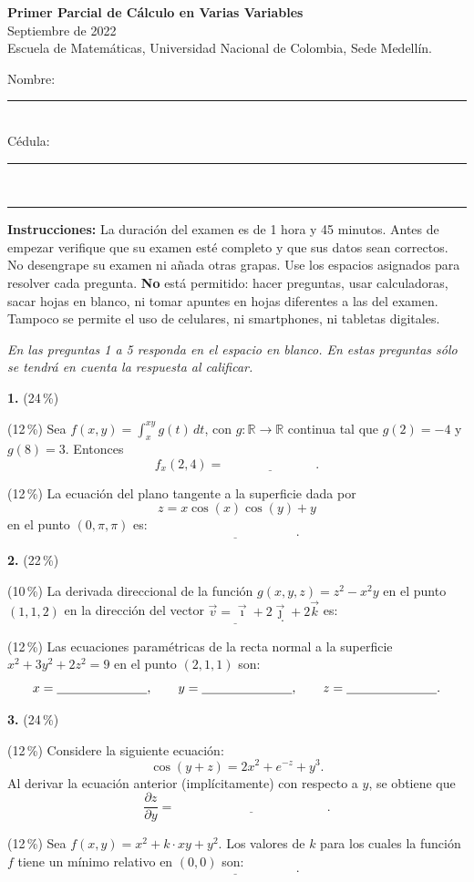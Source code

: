\documentclass[11pt]{article}
\newcommand{\examheader}{%
  \noindent
  \begin{minipage}[t]{0.62\linewidth}
    {\bfseries\large Primer Parcial de C\'alculo en Varias Variables}\\
    {\small Septiembre de 2022}\\
    {\small Escuela de Matem\'aticas, Universidad Nacional de Colombia, Sede Medell\'in.}
  \end{minipage}%
  \hfill
  \begin{minipage}[t]{0.33\linewidth}
    \raggedleft\small
    Nombre: \rule{2.8cm}{0.4pt}\\[4pt]
    C\'edula: \rule{2.8cm}{0.4pt}
  \end{minipage}\\[4pt]
  \rule{\linewidth}{0.6pt}
}
\begin{document}
\examheader

\textbf{Instrucciones:} La duraci\'on del examen es de 1 hora y 45 minutos. Antes de empezar verifique que su examen est\'e completo y que sus datos sean correctos. No desengrape su examen ni a\~nada otras grapas. Use los espacios asignados para resolver cada pregunta. \textbf{No} est\'a permitido: hacer preguntas, usar calculadoras, sacar hojas en blanco, ni tomar apuntes en hojas diferentes a las del examen. Tampoco se permite el uso de celulares, ni smartphones, ni tabletas digitales.

\bigskip

\textit{En las preguntas 1 a 5 responda en el espacio en blanco. En estas preguntas s\'olo se tendr\'a en cuenta la respuesta al calificar.}

\bigskip
\noindent\textbf{1.} (24\,\%)

\begin{opciones}
  \item[(a)] (12\,\%) Sea $\displaystyle f(x,y) = \int_x^{xy} g(t)\,dt$, con $g:\mathbb{R}\to\mathbb{R}$ continua tal que $g(2)=-4$ y $g(8)=3$. Entonces
  $$f_x(2,4) = \underline{\hspace{3cm}}.$$
  \item[(b)] (12\,\%) La ecuaci\'on del plano tangente a la superficie dada por
  $$z = x\cos(x)\cos(y) + y$$
  en el punto $(0,\pi,\pi)$ es:
  $$\underline{\hspace{4cm}}.$$
\end{opciones}

\bigskip
\noindent\textbf{2.} (22\,\%)

\begin{opciones}
  \item[(a)] (10\,\%) La derivada direccional de la funci\'on $g(x,y,z)=z^2-x^2y$ en el punto $(1,1,2)$ en la direcci\'on del vector $\vec v = \vec\imath+2\vec\jmath+2\vec k$ es:
  $$\underline{\hspace{3cm}}.$$
  \item[(b)] (12\,\%) Las ecuaciones param\'etricas de la recta normal a la superficie $x^2+3y^2+2z^2=9$ en el punto $(2,1,1)$ son:
  $$x=\underline{\hspace{2.5cm}}, \qquad y=\underline{\hspace{2.5cm}}, \qquad z=\underline{\hspace{2.5cm}}.$$
\end{opciones}

\bigskip
\noindent\textbf{3.} (24\,\%)

\begin{opciones}
  \item[(a)] (12\,\%) Considere la siguiente ecuaci\'on:
  $$\cos(y+z) = 2x^2+e^{-z}+y^3.$$
  Al derivar la ecuaci\'on anterior (impl\'icitamente) con respecto a $y$, se obtiene que
  $$\frac{\partial z}{\partial y} = \underline{\hspace{5cm}}.$$
  \item[(b)] (12\,\%) Sea $f(x,y)=x^2+k\cdot xy+y^2$. Los valores de $k$ para los cuales la funci\'on $f$ tiene un m\'inimo relativo en $(0,0)$ son:
  $$\underline{\hspace{4cm}}.$$
\end{opciones}
\end{document}
